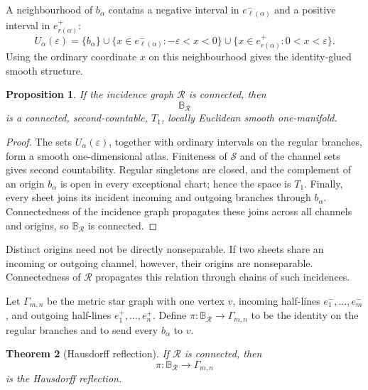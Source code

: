 \documentclass[11pt]{article}
\theoremstyle{plain}
\newtheorem{theorem}{Theorem}[section]
\newtheorem{proposition}[theorem]{Proposition}
\theoremstyle{definition}
\begin{document}
A neighbourhood of \(b_\alpha\) contains a negative interval in
\(e_{\ell(\alpha)}^-\) and a positive interval in \(e_{r(\alpha)}^+\):
\[
  U_\alpha(\varepsilon)
  =
  \{b_\alpha\}
  \cup
  \{x\in e_{\ell(\alpha)}^-:-\varepsilon<x<0\}
  \cup
  \{x\in e_{r(\alpha)}^+:0<x<\varepsilon\}.
\]
Using the ordinary coordinate \(x\) on this neighbourhood gives the
identity-glued smooth structure.

\begin{proposition}
\label{prop:Bmn-basic}
If the incidence graph \(\mathcal R\) is connected, then
\[
  \mathbb B_{\mathcal R}
\]
is a connected, second-countable, \(T_1\), locally Euclidean smooth
one-manifold.
\end{proposition}

\begin{proof}
The sets \(U_\alpha(\varepsilon)\), together with ordinary intervals on the
regular branches, form a smooth one-dimensional atlas. Finiteness of
\(\mathcal S\) and of the channel sets gives second countability. Regular
singletons are closed, and the complement of an origin \(b_\alpha\) is open
in every exceptional chart; hence the space is \(T_1\). Finally, every sheet
joins its incident incoming and outgoing branches through \(b_\alpha\).
Connectedness of the incidence graph propagates these joins across all
channels and origins, so \(\mathbb B_{\mathcal R}\) is connected.
\end{proof}

Distinct origins need not be directly nonseparable. If two sheets share an
incoming or outgoing channel, however, their origins are nonseparable.
Connectedness of \(\mathcal R\) propagates this relation through chains of
such incidences.

Let \(\Gamma_{m,n}\) be the metric star graph with one vertex \(v\), incoming half-lines
\(e_1^-,\ldots,e_m^-\),
and outgoing half-lines
\(e_1^+,\ldots,e_n^+\).
Define \(\pi: \mathbb B_{\mathcal R} \longrightarrow \Gamma_{m,n}\) to be the identity on the regular branches and to send every \(b_\alpha\)
to \(v\).

\begin{theorem}[Hausdorff reflection]
\label{thm:Bmn-Hausdorff-reflection}
If \(\mathcal R\) is connected, then
\[
  \pi:
  \mathbb B_{\mathcal R}
  \longrightarrow
  \Gamma_{m,n}
\]
is the Hausdorff reflection.
\end{theorem}
\end{document}

